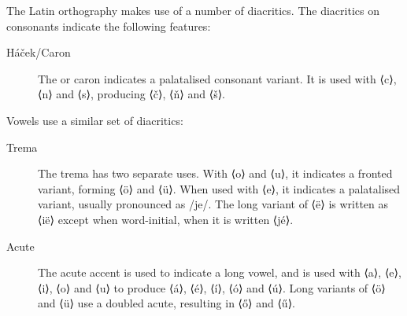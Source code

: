 \documentclass[grammar]{subfiles}
\begin{document}
  \pagebreak[2]
  The Latin orthography makes use of a number of diacritics.  The diacritics on consonants indicate the following features:

  \begin{description}
    \item[Háček/Caron] The  or caron indicates a palatalised consonant variant.  It is used with ⟨c⟩, ⟨n⟩ and ⟨s⟩, producing ⟨č⟩, ⟨ň⟩ and ⟨š⟩.
  \end{description}

  \pagebreak[2]
  Vowels use a similar set of diacritics:

  \begin{description}
    \item[Trema] The trema has two separate uses.  With ⟨o⟩ and ⟨u⟩, it indicates a fronted variant, forming ⟨ö⟩ and ⟨ü⟩.  When used with ⟨e⟩, it indicates a palatalised variant, usually pronounced as /je/.  The long variant of ⟨ë⟩ is written as ⟨ië⟩ except when word-initial, when it is written ⟨jé⟩. 


    \item[Acute] The acute accent is used to indicate a long vowel, and is used with ⟨a⟩, ⟨e⟩, ⟨i⟩, ⟨o⟩ and ⟨u⟩ to produce ⟨á⟩, ⟨é⟩, ⟨í⟩, ⟨ó⟩ and ⟨ú⟩.  Long variants of ⟨ö⟩ and ⟨ü⟩ use a doubled acute, resulting in ⟨ő⟩ and ⟨ű⟩. 
  \end{description}
\end{document}

